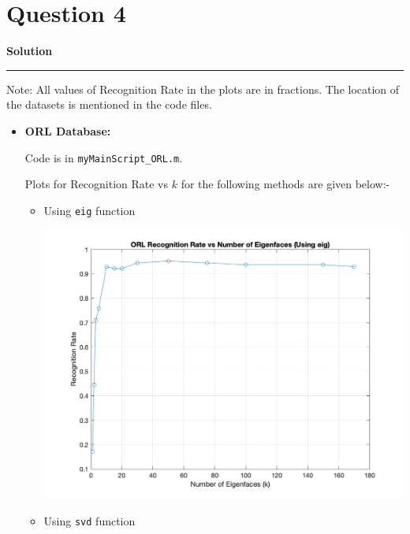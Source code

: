 \documentclass[a4paper,14pt]{article}
\title{\cooltitle{CS663 Assignment-4}}
\author{{\bf Saksham Rathi, Kavya Gupta, Shravan Srinivasa Raghavan} \\
\small Department of Computer Science, \\
Indian Institute of Technology Bombay \\}
\date{}
\newenvironment{solution}[2][]{%
    \begin{mdframed}[linecolor=blue!70!black, linewidth=2pt, roundcorner=10pt, backgroundcolor=yellow!10!white, skipabove=12pt, skipbelow=12pt]%
        \textbf{\large #2}
        \par\noindent\rule{\textwidth}{0.4pt}
}{
    \end{mdframed}
}
\begin{document}
\maketitle

\section*{Question 4}

\begin{solution}{Solution}
	Note: All values of Recognition Rate in the plots are in fractions. The location of the datasets is mentioned in the code files.
	\begin{itemize}
		\item \textbf{ORL Database:}

		Code is in \texttt{myMainScript\_ORL.m}. 

		Plots for Recognition Rate vs $k$ for the following methods are given below:-

		\begin{itemize}
			\item Using \texttt{eig} function
			
			\begin{center}
				\includegraphics[scale=0.4]{../images/ORL_eig.png}
			\end{center}

			\item Using \texttt{svd} function
			

\end{itemize}
\end{itemize}
\end{solution}
\end{document}
